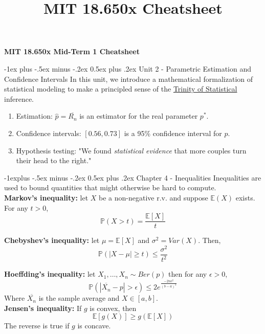 \documentclass[landscape]{article}
\title{MIT 18.650x Cheatsheet}
\makeatletter
\renewcommand{\section}{\@startsection{section}{1}{0mm}%
                                {-1ex plus -.5ex minus -.2ex}%
                                {0.5ex plus .2ex}%
                                {\normalfont\large\bfseries}}
\renewcommand{\subsection}{\@startsection{subsection}{2}{0mm}%
                                {-1explus -.5ex minus -.2ex}%
                                {0.5ex plus .2ex}%
                                {\normalfont\normalsize\bfseries}}
\makeatother
\begin{document}
\raggedright
\footnotesize

\begin{center}
    \textbf{MIT 18.650x Mid-Term 1 Cheatsheet}\\
\end{center}
\begin{multicols}{3}
\setlength{\premulticols}{1pt}
\setlength{\postmulticols}{1pt}
\setlength{\multicolsep}{1pt}
\setlength{\columnsep}{1pt}

\section{Unit 2 - Parametric Estimation and Confidence Intervals}
In this unit, we introduce a mathematical formalization of statistical modeling to make a principled sense of the \underline{Trinity of Statistical} inference.

\begin{enumerate}
    \item {Estimation: $\hat{p} = \overline{R_n}$ is an estimator for the real parameter $p^*$.}
    \item {Confidence intervals: $[0.56, 0.73]$ is a 95\% confidence interval for $p$.}
    \item {Hypothesis testing: "We found \textit{statistical evidence} that more couples turn their head to the right."}
\end{enumerate}

\subsection{Chapter 4 - Inequalities}
Inequalities are used to bound quantities that might otherwise be hard to compute. \\

\textbf{Markov's inequality:} let $X$ be a non-negative r.v. and suppose $\mathbb{E}(X)$ exists. For any $t > 0$,
$$\mathbb{P}(X > t) = \frac{\mathbb{E}[X]}{t}$$

\textbf{Chebyshev's inequality:} let $\mu = \mathbb{E}[X]$ and $\sigma^2 = Var(X)$. Then, $$\mathbb{P}(|X - \mu| \ge t) \leq \frac{\sigma^2}{t^2}$$

\textbf{Hoeffding's inequality:} let $X_1, \dots, X_n \sim{} Ber(p)$ then for any $\epsilon > 0$, $$\mathbb{P}(|\overline{X_n} - p| > \epsilon) \leq 2e^{\frac{-2n\epsilon^2}{(b-a)^2}}$$
Where $\overline{X_n}$ is the sample average and $X \in [a, b]$.\\

\textbf{Jensen's inequality:} If $g$ is convex, then $$\mathbb{E}[g(X)] \ge g(\mathbb{E}[X])$$
The reverse is true if $g$ is concave.


\end{multicols}
\end{document}
